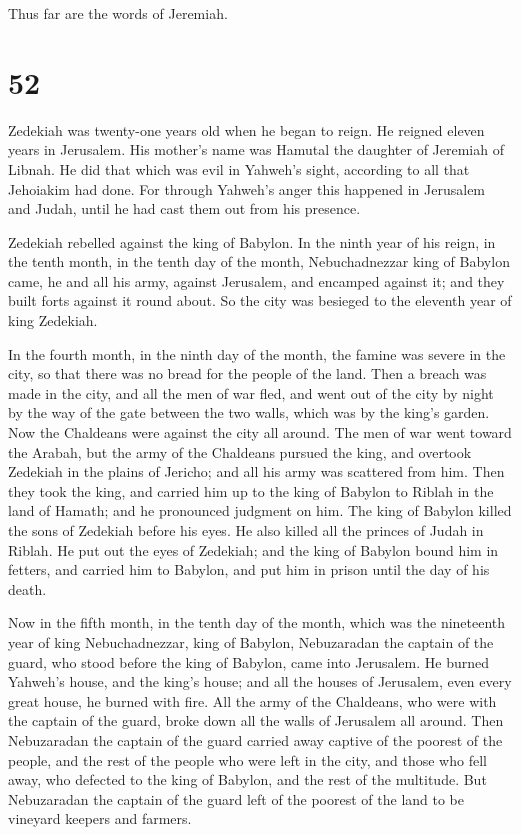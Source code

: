 Thus far are the words of Jeremiah.

\hypertarget{section-51}{%
\section{52}\label{section-51}}

 Zedekiah was twenty-one years old when he began to reign.
He reigned eleven years in Jerusalem. His mother's name was Hamutal the
daughter of Jeremiah of Libnah.  He did that which was evil
in Yahweh's sight, according to all that Jehoiakim had done.
 For through Yahweh's anger this happened in Jerusalem and
Judah, until he had cast them out from his presence.

Zedekiah rebelled against the king of Babylon.  In the ninth
year of his reign, in the tenth month, in the tenth day of the month,
Nebuchadnezzar king of Babylon came, he and all his army, against
Jerusalem, and encamped against it; and they built forts against it
round about.  So the city was besieged to the eleventh year
of king Zedekiah.

 In the fourth month, in the ninth day of the month, the
famine was severe in the city, so that there was no bread for the people
of the land.  Then a breach was made in the city, and all
the men of war fled, and went out of the city by night by the way of the
gate between the two walls, which was by the king's garden. Now the
Chaldeans were against the city all around. The men of war went toward
the Arabah,  but the army of the Chaldeans pursued the king,
and overtook Zedekiah in the plains of Jericho; and all his army was
scattered from him.  Then they took the king, and carried
him up to the king of Babylon to Riblah in the land of Hamath; and he
pronounced judgment on him.  The king of Babylon killed the
sons of Zedekiah before his eyes. He also killed all the princes of
Judah in Riblah.  He put out the eyes of Zedekiah; and the
king of Babylon bound him in fetters, and carried him to Babylon, and
put him in prison until the day of his death.

 Now in the fifth month, in the tenth day of the month,
which was the nineteenth year of king Nebuchadnezzar, king of Babylon,
Nebuzaradan the captain of the guard, who stood before the king of
Babylon, came into Jerusalem.  He burned Yahweh's house,
and the king's house; and all the houses of Jerusalem, even every great
house, he burned with fire.  All the army of the Chaldeans,
who were with the captain of the guard, broke down all the walls of
Jerusalem all around.  Then Nebuzaradan the captain of the
guard carried away captive of the poorest of the people, and the rest of
the people who were left in the city, and those who fell away, who
defected to the king of Babylon, and the rest of the multitude.
 But Nebuzaradan the captain of the guard left of the
poorest of the land to be vineyard keepers and farmers.

